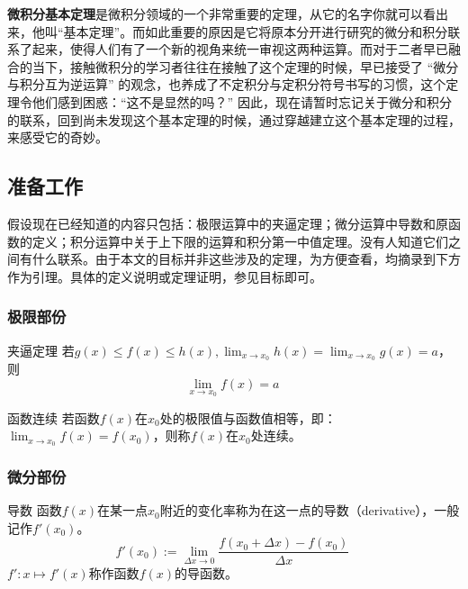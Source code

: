 
\begin{issues}
\issueTODO
\issueMissDepend
\issueNeedCite
\end{issues}

\textbf{微积分基本定理}是微积分领域的一个非常重要的定理，从它的名字你就可以看出来，他叫“基本定理”。而如此重要的原因是它将原本分开进行研究的微分和积分联系了起来，使得人们有了一个新的视角来统一审视这两种运算。而对于二者早已融合的当下，接触微积分的学习者往往在接触了这个定理的时候，早已接受了 “微分与积分互为逆运算” 的观念，也养成了不定积分与定积分符号书写的习惯，这个定理令他们感到困惑：“这不是显然的吗？”
因此，现在请暂时忘记关于微分和积分的联系，回到尚未发现这个基本定理的时候，通过穿越建立这个基本定理的过程，来感受它的奇妙。

\subsection{准备工作}

假设现在已经知道的内容只包括：极限运算中的夹逼定理；微分运算中导数和原函数的定义；积分运算中关于上下限的运算和积分第一中值定理。没有人知道它们之间有什么联系。由于本文的目标并非这些涉及的定理，为方便查看，均摘录到下方作为引理。具体的定义说明或定理证明，参见目标即可。

\subsubsection{极限部份}
\begin{lemma}{夹逼定理}\label{lem_FTcalc_3}
若$g(x)\leq f(x)\leq h(x),\lim _{x\to x_0}h(x)=\lim _{x\to x_0}g(x)=a$，则
$$\lim _{x\to x_0}f(x)=a~$$
\end{lemma}

\begin{definition}{函数连续}\label{def_FTcalc_1}
若函数$f(x)$在$x_0$处的极限值与函数值相等，即：$\lim_{x\to x_0}f(x)=f(x_0)$，则称$f(x)$在$x_0$处连续。
\end{definition}

\subsubsection{微分部份}
\begin{definition}{导数}\label{def_FTcalc_2}
函数$f(x)$在某一点$x_0$附近的变化率称为在这一点的导数（derivative），一般记作$f'(x_0)$。
$$f'(x_0):=\lim_{\Delta x\to0}{\frac{f(x_0+\Delta x)-f(x_0)}{\Delta x}}~$$
$f':x\mapsto f'(x)$称作函数$f(x)$的导函数。
\end{definition}

